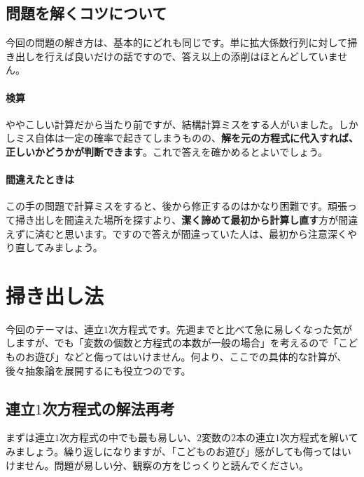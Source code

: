 \subsection{問題を解くコツについて}

今回の問題の解き方は、基本的にどれも同じです。単に拡大係数行列に対して掃き出しを行えば良いだけの話ですので、答え以上の添削はほとんどしていません。

\paragraph{検算}

ややこしい計算だから当たり前ですが、結構計算ミスをする人がいました。しかしミス自体は一定の確率で起きてしまうものの、\textbf{解を元の方程式に代入すれば、正しいかどうかが判断できます}。これで答えを確かめるとよいでしょう。

\paragraph{間違えたときは}

この手の問題で計算ミスをすると、後から修正するのはかなり困難です。頑張って掃き出しを間違えた場所を探すより、\textbf{潔く諦めて最初から計算し直す}方が間違えずに済むと思います。ですので答えが間違っていた人は、最初から注意深くやり直してみましょう。

\section{掃き出し法} \label{section:swipe}

今回のテーマは、連立$1$次方程式です。先週までと比べて急に易しくなった気がしますが、でも「変数の個数と方程式の本数が一般の場合」を考えるので「こどものお遊び」などと侮ってはいけません。何より、ここでの具体的な計算が、後々抽象論を展開するにも役立つのです。

\subsection{連立$1$次方程式の解法再考}

まずは連立$1$次方程式の中でも最も易しい、$2$変数の$2$本の連立$1$次方程式を解いてみましょう。繰り返しになりますが、「こどものお遊び」感がしても侮ってはいけません。問題が易しい分、観察の方をじっくりと読んでください。

